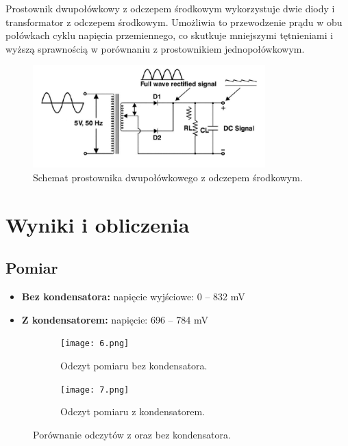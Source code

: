 \documentclass[a4paper,12pt]{article}
\begin{document}
Prostownik dwupołówkowy z odczepem środkowym wykorzystuje dwie diody i transformator z odczepem środkowym. Umożliwia to przewodzenie prądu w obu połówkach cyklu napięcia przemiennego, co skutkuje mniejszymi tętnieniami i wyższą sprawnością w porównaniu z prostownikiem jednopołówkowym.

\begin{figure}[H]
    \centering
    \includegraphics[width=0.8\textwidth]{5.png}
    \caption{Schemat prostownika dwupołówkowego z odczepem środkowym.}
    \label{fig:schemat_dwu}
\end{figure}

\section*{Wyniki i obliczenia}

\subsection*{Pomiar}

\begin{itemize}
    \item \textbf{Bez kondensatora:} napięcie wyjściowe: 0 -- 832 mV
    \item \textbf{Z kondensatorem:} napięcie: 696 -- 784 mV
\end{itemize}
\begin{figure}[h]
    \centering
    \begin{subfigure}{0.45\textwidth}
        \centering
        \texttt{[image: 6.png]}
        \caption{Odczyt pomiaru bez kondensatora.}
        \label{fig:schemat1}
    \end{subfigure}
    \hfill
    \begin{subfigure}{0.45\textwidth}
        \centering
        \texttt{[image: 7.png]}
        \caption{Odczyt pomiaru z kondensatorem.}
        \label{fig:schemat2}
    \end{subfigure}
    \caption{Porównanie odczytów z oraz bez kondensatora.}
    \label{fig:porownanie}
\end{figure}
\end{document}
